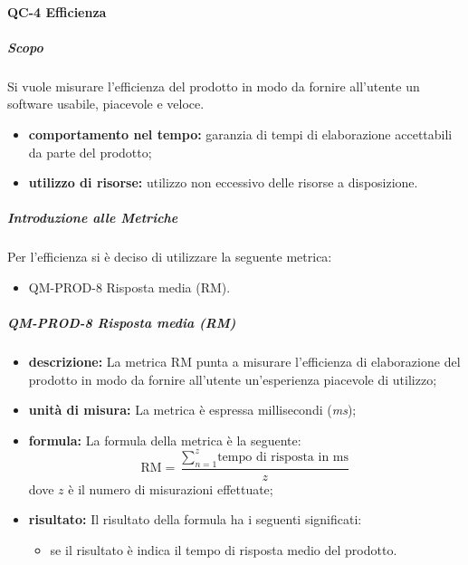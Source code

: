 		\paragraph{QC-4 Efficienza}
			\subparagraph{Scopo}
				Si vuole misurare l'efficienza del prodotto in modo da fornire all'utente un software usabile, piacevole e veloce.
				\begin{itemize}
					\item \textbf{comportamento nel tempo:} garanzia di tempi di elaborazione accettabili da parte del prodotto;
					\item \textbf{utilizzo di risorse:} utilizzo non eccessivo delle risorse a disposizione.
				\end{itemize}
			\subparagraph{Introduzione alle Metriche}
				Per l'efficienza si è deciso di utilizzare la seguente metrica:
				\begin{itemize}
					\item QM-PROD-8 Risposta media (RM).
				\end{itemize}
			\subparagraph{QM-PROD-8 Risposta media (RM)}
			\begin{itemize}
      			\item \textbf{descrizione: }
					La metrica RM punta a misurare l'efficienza di elaborazione del prodotto in modo da fornire all'utente un'esperienza piacevole di utilizzo;
				\item \textbf{unità di misura: }
					La metrica è espressa millisecondi (\textit{ms});
				\item \textbf{formula: }
					La formula della metrica è la seguente:
					\[
						\text{RM} = \frac{\sum_{n=1}^{z} \text{tempo di risposta in ms}}{z}
					\]
					dove $z$ è il numero di misurazioni effettuate;
				\item \textbf{risultato: }
					Il risultato della formula ha i seguenti significati:
					\begin{itemize}
						\item se il risultato è indica il tempo di risposta medio del prodotto.
					\end{itemize}
			\end{itemize}


